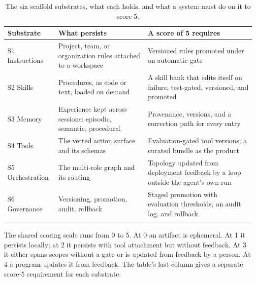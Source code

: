 \documentclass[
  11pt,
]{article}
\begin{document}
\begin{table}[htbp]
\caption{The six scaffold substrates, what each holds, and what a system must do on it to score 5.}\label{tab:V-1}
\centering\small
\begin{tabular}{@{}
  >{\raggedright\arraybackslash}p{}
  >{\raggedright\arraybackslash}p{}
  >{\raggedright\arraybackslash}p{}@{}}
\toprule\noalign{}
\begin{minipage}[b]{\linewidth}\raggedright
Substrate
\end{minipage} & \begin{minipage}[b]{\linewidth}\raggedright
What persists
\end{minipage} & \begin{minipage}[b]{\linewidth}\raggedright
A score of 5 requires
\end{minipage} \\
\midrule\noalign{}


S1 Instructions & Project, team, or organization rules attached to a workspace & Versioned rules promoted under an automatic gate \\ \addlinespace[2.5pt]
S2 Skills & Procedures, as code or text, loaded on demand & A skill bank that edits itself on failure, test-gated, versioned, and promoted \\ \addlinespace[2.5pt]
S3 Memory & Experience kept across sessions: episodic, semantic, procedural & Provenance, versions, and a correction path for every entry \\ \addlinespace[2.5pt]
S4 Tools & The vetted action surface and its schemas & Evaluation-gated tool versions; a curated bundle as the product \\ \addlinespace[2.5pt]
S5 Orchestration & The multi-role graph and its routing & Topology updated from deployment feedback by a loop outside the agent's own run \\ \addlinespace[2.5pt]
S6 Governance & Versioning, promotion, audit, rollback & Staged promotion with evaluation thresholds, an audit log, and rollback \\ \addlinespace[2.5pt]
\bottomrule\noalign{}
\end{tabular}
\end{table}

The shared scoring scale runs from 0 to 5. At 0 an artifact is ephemeral. At 1 it persists locally; at 2 it persists with tool attachment but without feedback. At 3 it either spans scopes without a gate or is updated from feedback by a person. At 4 a program updates it from feedback. The table's last column gives a separate score-5 requirement for each substrate.
\end{document}

